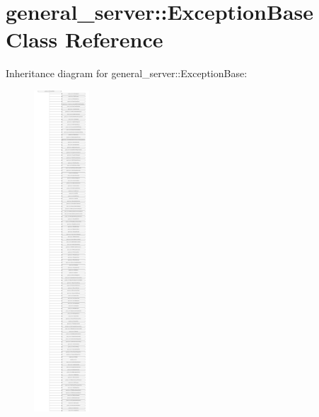 \hypertarget{classgeneral__server_1_1ExceptionBase}{\section{general\-\_\-server\-:\-:\-Exception\-Base \-Class \-Reference}
\label{classgeneral__server_1_1ExceptionBase}
}
\-Inheritance diagram for general\-\_\-server\-:\-:\-Exception\-Base\-:\begin{figure}[H]
\begin{center}
\leavevmode
\includegraphics[height=12.000000cm]{classgeneral__server_1_1ExceptionBase}
\end{center}
\end{figure}
